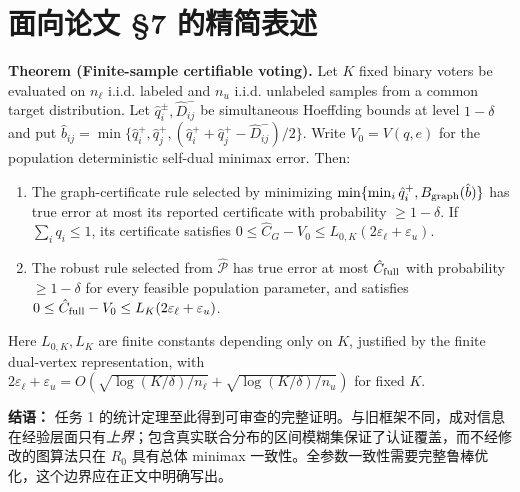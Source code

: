 \documentclass[11pt,a4paper]{ctexart}
\theoremstyle{definition}
\newcommand{\calP}{\mathcal P}
\newcommand{\epsl}{\varepsilon_{\ell}}
\newcommand{\epsu}{\varepsilon_u}
\begin{document}
\section{面向论文 \S7 的精简表述}
\begin{keybox}
\textbf{Theorem (Finite-sample certifiable voting).}
Let $K$ fixed binary voters be evaluated on $n_\ell$ i.i.d. labeled and $n_u$ i.i.d. unlabeled samples from a common target distribution. Let $\hat q_i^\pm,\hat D_{ij}^-$ be simultaneous Hoeffding bounds at level $1-\delta$ and put $\hat b_{ij}=\min\{\hat q_i^+,\hat q_j^+,(\hat q_i^++\hat q_j^+-\hat D_{ij}^-)/2\}$. Write $V_0=V(q,e)$ for the population deterministic self-dual minimax error. Then: 
\begin{enumerate}[leftmargin=1.5em]
\item The graph-certificate rule selected by minimizing $\min\{\min_i\hat q_i^+,B_{\rm graph}(\hat b)\}$ has true error at most its reported certificate with probability $\ge1-\delta$. If $\sum_iq_i\le1$, its certificate satisfies $0\le\hat C_G-V_0\le L_{0,K}(2\epsl+\epsu)$.
\item The robust rule selected from $\widehat{\calP}$ has true error at most $\hat C_{\rm full}$ with probability $\ge1-\delta$ for every feasible population parameter, and satisfies $0\le\hat C_{\rm full}-V_0\le L_K(2\epsl+\epsu)$.
\end{enumerate}
Here $L_{0,K},L_K$ are finite constants depending only on $K$, justified by the finite dual-vertex representation, with $2\epsl+\epsu=O(\sqrt{\log(K/\delta)/n_\ell}+\sqrt{\log(K/\delta)/n_u})$ for fixed $K$.
\end{keybox}
\vspace{.4em}
\noindent\textbf{结语：} 任务 1 的统计定理至此得到可审查的完整证明。与旧框架不同，成对信息在经验层面只有\emph{上界}；包含真实联合分布的区间模糊集保证了认证覆盖，而不经修改的图算法只在 $R_0$ 具有总体 minimax 一致性。全参数一致性需要完整鲁棒优化，这个边界应在正文中明确写出。
\end{document}
